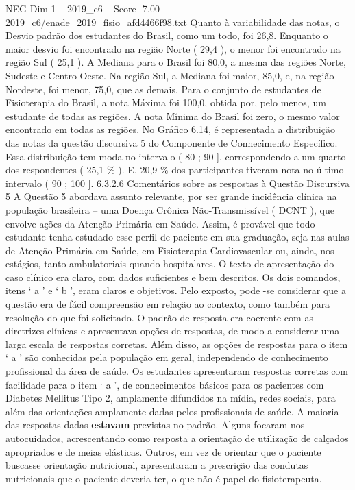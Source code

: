 \begin{textsample}{NEG Dim 1 – 2019\_c6 – Score -7.00 – 2019\_c6/enade\_2019\_fisio\_afd4466f98.txt}
Quanto à variabilidade das notas, o Desvio padrão dos estudantes do Brasil, como um todo, foi 26,8.
Enquanto o maior desvio foi encontrado na região Norte ( 29,4 ), o menor foi encontrado na região Sul ( 25,1 ).
A Mediana para o Brasil foi 80,0, a mesma das regiões Norte, Sudeste e Centro-Oeste.
Na região Sul, a Mediana foi maior, 85,0, e, na região Nordeste, foi menor, 75,0, que as demais.
Para o conjunto de estudantes de Fisioterapia do Brasil, a nota Máxima foi 100,0, obtida por, pelo menos, um estudante de todas as regiões.
A nota Mínima do Brasil foi zero, o mesmo valor encontrado em todas as regiões.
No Gráfico 6.14, é representada a distribuição das notas da questão discursiva 5 do Componente de Conhecimento Específico.
Essa distribuição tem moda no intervalo ( 80 ; 90 ], correspondendo a um quarto dos respondentes ( 25,1 \% ).
E, 20,9 \% dos participantes tiveram nota no último intervalo ( 90 ; 100 ]. 6.3.2.6 Comentários sobre as respostas à Questão Discursiva 5 A Questão 5 abordava assunto relevante, por ser grande incidência clínica na população brasileira – uma Doença Crônica Não-Transmissível ( DCNT ), que envolve ações da Atenção Primária em Saúde.
Assim, é provável que todo estudante tenha estudado esse perfil de paciente em sua graduação, seja nas aulas de Atenção Primária em Saúde, em Fisioterapia Cardiovascular ou, ainda, nos estágios, tanto ambulatoriais quando hospitalares.
O texto de apresentação do caso clínico era claro, com dados suficientes e bem descritos.
Os dois comandos, itens ‘ a ’ e ‘ b ’, eram claros e objetivos.
Pelo exposto, pode -se considerar que a questão era de fácil compreensão em relação ao contexto, como também para resolução do que foi solicitado.
O padrão de resposta era coerente com as diretrizes clínicas e apresentava opções de respostas, de modo a considerar uma larga escala de respostas corretas.
Além disso, as opções de respostas para o item ‘ a ’ são conhecidas pela população em geral, independendo de conhecimento profissional da área de saúde.
Os estudantes apresentaram respostas corretas com facilidade para o item ‘ a ’, de conhecimentos básicos para os pacientes com Diabetes Mellitus Tipo 2, amplamente difundidos na mídia, redes sociais, para além das orientações amplamente dadas pelos profissionais de saúde.
A maioria das respostas dadas \textbf{estavam} previstas no padrão.
Alguns focaram nos autocuidados, acrescentando como resposta a orientação de utilização de calçados apropriados e de meias elásticas.
Outros, em vez de orientar que o paciente buscasse orientação nutricional, apresentaram a prescrição das condutas nutricionais que o paciente deveria ter, o que não é papel do fisioterapeuta.

\end{textsample}
